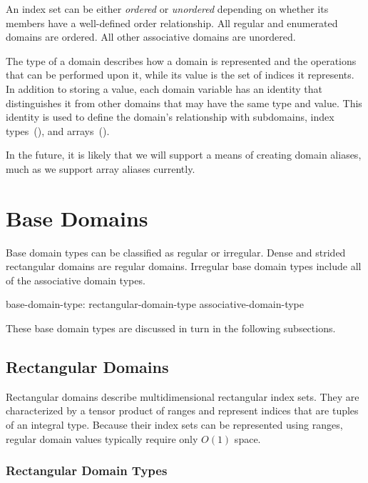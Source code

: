 An index set can be either \emph{ordered} or \emph{unordered} depending on
whether its members have a well-defined order relationship.  All regular and
enumerated domains are ordered.  All other associative domains are
unordered.

The type of a domain describes how a domain is represented and the operations
that can be performed upon it, while its value is the set of indices it represents.
In addition to storing a value, each domain variable has an identity that
distinguishes it from other domains that may have the same type and
value.  This identity is used to define the domain's relationship
with subdomains, index types~(),
and arrays~().

\begin{openissue}
In the future, it is likely that we will support a means of creating
domain aliases, much as we support array aliases currently.
\end{openissue}


\section{Base Domains}
\label{Base_Domains}

Base domain types can be classified as regular or irregular.  Dense and
strided rectangular domains are regular domains.
Irregular base domain types include all of the associative domain types.

\begin{syntax}
base-domain-type:
  rectangular-domain-type
  associative-domain-type
\end{syntax}

These base domain types are discussed in turn in the following
subsections.

\subsection{Rectangular Domains}

Rectangular domains describe multidimensional rectangular index sets.  They are
characterized by a tensor product of ranges and represent indices that are
tuples of an integral type.  Because their index sets can be represented using
ranges, regular domain values typically require only $O(1)$ space.

\subsubsection{Rectangular Domain Types}

